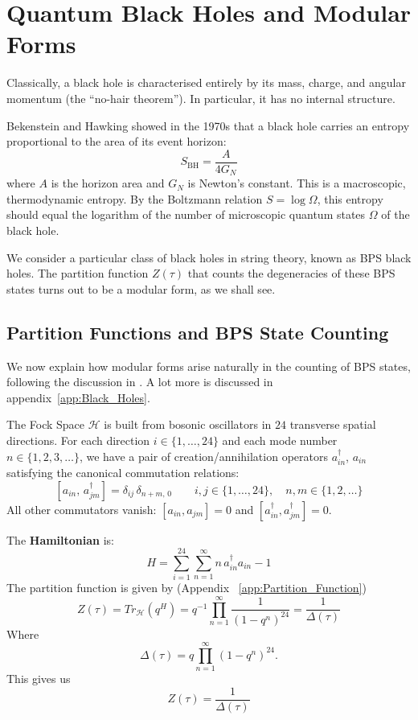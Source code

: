 
\chapter{Quantum Black Holes and Modular Forms}

Classically, a black hole is characterised entirely by its 
mass, charge, and angular momentum (the ``no-hair theorem''). In particular, it 
has no internal structure.

Bekenstein and Hawking 
showed in the 1970s that a black hole carries an entropy proportional to the area 
of its event horizon:
\begin{equation}
    S_{\text{BH}} = \frac{A}{4G_N}
\end{equation}
where $A$ is the horizon area and $G_N$ is Newton's constant. This is a 
macroscopic, thermodynamic entropy. By the Boltzmann relation $S = \log \Omega$, 
this entropy should equal the logarithm of the number of microscopic quantum 
states $\Omega$ of the black hole.

We consider a particular class of black holes in string theory, known as BPS black holes. 
The partition function $Z(\tau)$ that counts the degeneracies of these BPS states turns out to be a modular form, as we shall see.

\section{Partition Functions and BPS State Counting}
We now explain how modular forms arise naturally in the counting of BPS states, following the discussion in \cite{DMZ}. A lot more is discussed in appendix~\ref{app:Black_Holes}.

The Fock Space $\mathcal{H}$ is built from bosonic 
oscillators in $24$ transverse spatial directions. For each direction 
$i \in \{1,\ldots,24\}$ and each mode number $n \in \{1,2,3,\ldots\}$, 
we have a pair of creation/annihilation operators $a^\dagger_{in}$, $a_{in}$ 
satisfying the canonical commutation relations:
\begin{equation}\label{CCR}
    [a_{in},\, a^\dagger_{jm}] = \delta_{ij}\,\delta_{n+m,\,0}
    \qquad i,j \in \{1,\ldots,24\},\quad n,m \in \{1,2,\ldots\}
\end{equation}
All other commutators vanish: $[a_{in}, a_{jm}] = 0$ and 
$[a^\dagger_{in}, a^\dagger_{jm}] = 0$.

The \textbf{Hamiltonian} is:
\begin{equation}\label{Hamiltonian}
    H = \sum_{i=1}^{24}\sum_{n=1}^{\infty} n\, a^\dagger_{in} a_{in} - 1
\end{equation}
The partition function is given by (Appendix~ \ref{app:Partition_Function}) \begin{equation}
    Z(\tau)=Tr_{\mathcal{H}}\left(q^H\right)=q^{-1}\prod_{n=1}^{\infty} \frac{1}{(1-q^n)^{24}} = \frac{1}{\Delta(\tau)}
\end{equation} 
Where $$\Delta(\tau) = q \prod_{n=1}^{\infty} (1 - q^n)^{24}.$$
This gives us \begin{equation}\label{the_inverse_delta}
    \boxed{Z(\tau) = \frac{1}{\Delta(\tau)}}
\end{equation}   

